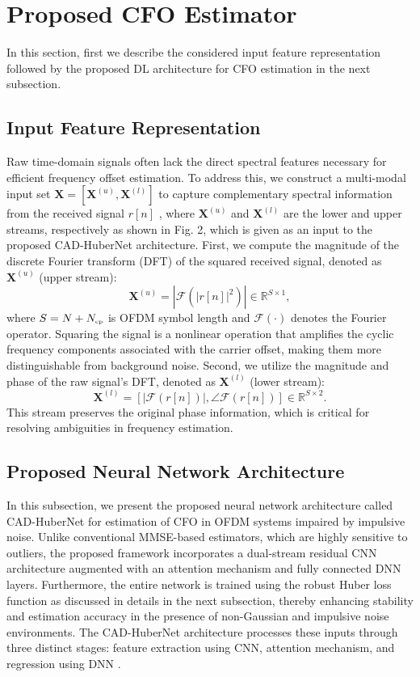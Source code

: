 \documentclass[10pt, journal]{IEEEtran}
\begin{document}
\section{Proposed CFO Estimator}
In this section, first we describe the considered input feature representation followed by the proposed DL architecture for CFO estimation  in the next subsection. 

\subsection{Input Feature Representation}
Raw time-domain signals often lack the direct spectral features necessary for efficient frequency offset estimation. To address this, we construct a multi-modal input set $\mathbf{X} = [\mathbf{X}^{(u)}, \mathbf{X}^{(l)}]$ to capture complementary spectral information from the received signal $r[n]$ \cite{chaudhari2023_cad}, where $\mathbf{X}^{(u)}$ and $\mathbf{X}^{(l)}$ are the lower and upper streams, respectively as shown in Fig. 2, which is given as an input to the proposed CAD-HuberNet architecture. First, we compute the magnitude of the discrete Fourier transform (DFT) of the squared received signal, denoted as $\mathbf{X}^{(u)}$ (upper stream):
\begin{equation}
\mathbf{X}^{(u)} = \left| \mathcal{F}\left(|r[n]|^2\right) \right| \in \mathbb{R}^{S \times 1},
\end{equation}
where $S=N+N_{\text{\tiny{cp}}}$ is OFDM symbol length and $\mathcal{F}(\cdot)$ denotes the Fourier operator. Squaring the signal is a nonlinear operation that amplifies the cyclic frequency components associated with the carrier offset, making them more distinguishable from background noise. Second, we utilize the magnitude and phase of the raw signal's DFT, denoted as $\mathbf{X}^{(l)}$ (lower stream):
\begin{equation}
\mathbf{X}^{(l)} = \left[ \left| \mathcal{F}(r[n]) \right|, \angle \mathcal{F}(r[n]) \right] \in \mathbb{R}^{S \times 2}.
\end{equation}
This stream preserves the original phase information, which is critical for resolving ambiguities in frequency estimation.

\subsection{Proposed Neural Network Architecture}
In this subsection, we present the proposed neural network architecture called CAD-HuberNet for estimation of CFO in OFDM systems impaired by impulsive noise. Unlike conventional MMSE-based estimators, which are highly sensitive to outliers, the proposed framework incorporates a dual-stream residual CNN architecture augmented with an attention mechanism and fully connected DNN layers. Furthermore, the entire network is trained using the robust Huber loss function as discussed in details in the next subsection, thereby enhancing stability and estimation accuracy in the presence of non-Gaussian and impulsive noise environments. The CAD-HuberNet architecture processes these inputs through three distinct stages: feature extraction using CNN, attention mechanism, and regression using DNN \cite{chaudhari2023_cad}. 
\end{document}
